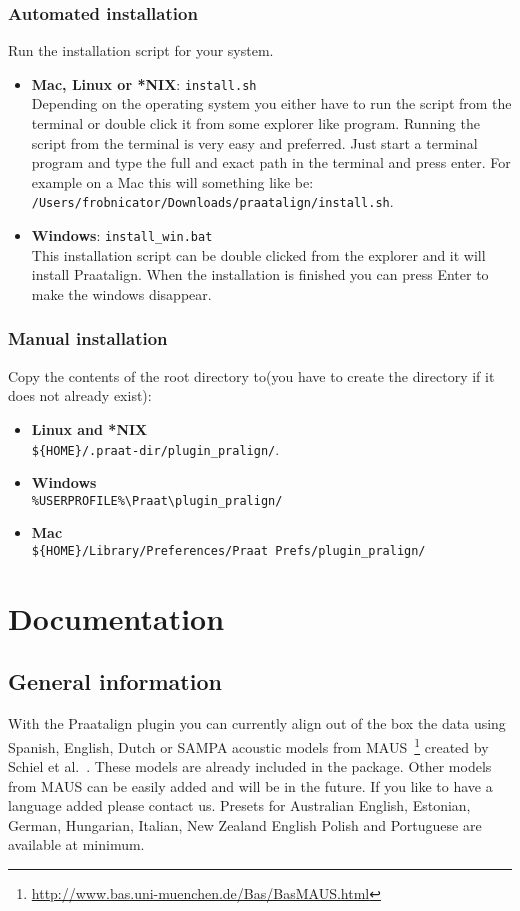 \subsection{Automated installation}
Run the installation script for your system.
\begin{itemize}
	\item \textbf{Mac, Linux or *NIX}: \texttt{install.sh}\\
		Depending on the operating system you either have to run the script from
		the terminal or double click it from some explorer like program. Running
		the script from the terminal is very easy and preferred. Just start a
		terminal program and type the full and exact path in the terminal and press
		enter. For example on a Mac this will something like be:\\
		\texttt{/Users/frobnicator/Downloads/praatalign/install.sh}.
	\item \textbf{Windows}: \texttt{install\_win.bat}\\
		This installation script can be double clicked from the explorer and it
		will install Praatalign. When the installation is finished you can press
		Enter to make the windows disappear.
\end{itemize}

\subsection{Manual installation}
Copy the contents of the root directory to(you have to create the directory if
it does not already exist):
\begin{itemize}
	\item \textbf{Linux and *NIX}\\
		\texttt{\$\{HOME\}/.praat-dir/plugin\_pralign/}.
	\item \textbf{Windows}\\
		\texttt{\%USERPROFILE\%\textbackslash Praat\textbackslash plugin\_pralign/}
	\item \textbf{Mac}\\
		\texttt{\$\{HOME\}/Library/Preferences/Praat Prefs/plugin\_pralign/}
\end{itemize}

\chapter{Documentation}
\section{General information}
With the Praatalign plugin you can currently align out of the box the data
using Spanish, English, Dutch or SAMPA acoustic models from
MAUS~\footnote{\url{http://www.bas.uni-muenchen.de/Bas/BasMAUS.html}} created
by Schiel et al.~\cite{schiel1999}. These models are already included in the
package. Other models from MAUS can be easily added and will be in the future.
If you like to have a language added please contact us.
Presets for Australian English, Estonian, German, Hungarian, Italian, New
Zealand English Polish and Portuguese are available at minimum.

